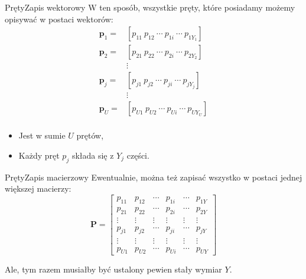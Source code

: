 \documentclass[11pt]{beamer}
\begin{document}
\begin{frame}{Pręty}{Zapis wektorowy}
W ten sposób, wszystkie pręty, które posiadamy możemy opisywać w postaci wektorów:
\begin{align*}
\mathbf{p}_1 = & \left[p_{11} \ p_{12} \ \cdots \ p_{1i} \ \cdots \ p_{1Y_1}\right] \\
\mathbf{p}_2 = & \left[p_{21} \ p_{22} \ \cdots \ p_{2i} \ \cdots \ p_{2Y_2}\right] \\
& \vdots \\
\mathbf{p}_j = & \left[p_{j1} \ p_{j2} \ \cdots \ p_{ji} \ \cdots \ p_{jY_j}\right] \\
& \vdots \\
\mathbf{p}_U = & \left[p_{U1} \ p_{U2} \ \cdots \ p_{Ui} \ \cdots \ p_{UY_U}\right] \\
\end{align*}

\begin{itemize}
\item<2-> Jest w sumie $U$ prętów,
\item<3-> Każdy pręt $p_j$ składa się z $Y_j$ części.
\end{itemize}
\end{frame}


\begin{frame}{Pręty}{Zapis macierzowy}
Ewentualnie, można też zapisać wszystko w postaci jednej większej macierzy:
\begin{equation*}
\mathbf{P} =
\begin{bmatrix}
p_{11} & p_{12} & \cdots & p_{1i} & \cdots & p_{1Y} \\
p_{21} & p_{22} & \cdots & p_{2i} & \cdots & p_{2Y} \\
\vdots & \vdots & \vdots & \vdots & \vdots & \vdots \\
p_{j1} & p_{j2} & \cdots & p_{ji} & \cdots & p_{jY} \\
\vdots & \vdots & \vdots & \vdots & \vdots & \vdots \\
p_{U1} & p_{U2} & \cdots & p_{Ui} & \cdots & p_{UY}
\end{bmatrix}
\end{equation*}

\pause

Ale, tym razem musiałby być ustalony pewien stały wymiar $Y$.
\end{frame}
\end{document}
